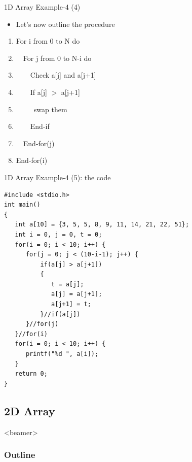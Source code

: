 \begin{frame}{1D Array Example-4 (4)}
\begin{itemize}
	\item {Let's now outline the procedure}
\end{itemize}
\begin{enumerate}
	\item {For i from 0 to N do}
	\item {~~For j from 0 to N-i do}
	\item {~~~~Check a[j] and a[j+1]}
	\item {~~~~If a[j] $>$ a[j+1]}
	\item {~~~~~swap them}
	\item {~~~~End-if}
	\item {~~End-for(j)}
	\item {End-for(i)}
\end{enumerate}
\end{frame}

\begin{frame}[fragile]{1D Array Example-4 (5): the code}
\vspace{-0.1in}
\begin{lstlisting}[xleftmargin=0.08\linewidth,linewidth=0.9\linewidth]
#include <stdio.h>
int main()
{
   int a[10] = {3, 5, 5, 8, 9, 11, 14, 21, 22, 51};
   int i = 0, j = 0, t = 0;
   for(i = 0; i < 10; i++) {
      for(j = 0; j < (10-i-1); j++) {
          if(a[j] > a[j+1]) 
          {
             t = a[j];
             a[j] = a[j+1];
             a[j+1] = t;
          }//if(a[j])
      }//for(j)
   }//for(i)
   for(i = 0; i < 10; i++) {
      printf("%d ", a[i]);
   }   
   return 0;
}
\end{lstlisting}
\end{frame}

\subsection{2D Array}
\label{sec:2darry}
\begin{frame}<beamer>
    \frametitle{Outline}
\end{frame}

